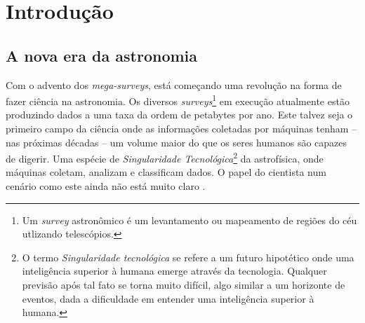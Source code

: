 


\chapter{Introdução}
\label{sec:Intro}


\section{A nova era da astronomia}
\label{sec:Intro:NovaEra}


Com o advento dos {\em mega-surveys}\fixme, está começando uma revolução na
forma de fazer ciência na astronomia. Os diversos {\em surveys}\footnote{Um {\em
survey} astronômico é um levantamento ou mapeamento de regiões do céu utlizando
telescópios.} em execução atualmente estão produzindo dados a uma taxa da ordem
de petabytes por ano. Este talvez seja o primeiro campo da ciência onde as
informações coletadas por máquinas tenham -- nas próximas décadas -- um volume
maior do que os seres humanos são capazes de digerir. Uma espécie de {\em
Singularidade Tecnológica}\footnote{O termo {\em Singularidade tecnológica} se
refere a um futuro hipotético onde uma inteligência superior à humana emerge
através da tecnologia. Qualquer previsão após tal fato se torna muito difícil,
algo similar a um horizonte de eventos, dada a dificuldade em entender uma
inteligência superior à humana.} da astrofísica, onde máquinas coletam, analizam
e classificam dados. O papel do cientista num cenário como este ainda não está
muito claro \citep{Norris2010}.

